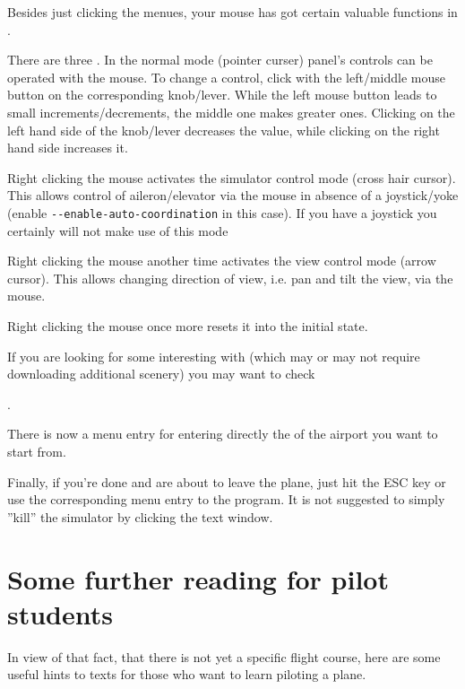 Besides just clicking the menues, your mouse has got certain valuable functions in \FlightGear{}$\!$.


There are three . In the normal mode (pointer curser) panel's controls can be operated with the mouse. To change a control, click with the left/middle mouse button on the corresponding knob/lever. While the left mouse button leads to small increments/decrements, the middle one makes greater ones. Clicking on the left hand side of the knob/lever decreases the value, while clicking on the right hand side increases
it.

 Right clicking the mouse activates the simulator control mode (cross hair cursor). This allows control of aileron/elevator via the mouse in absence of a joystick/yoke (enable \texttt{-$ $-enable-auto-coordination} in this case). If you have a joystick you certainly will not make use of this mode

 Right clicking the mouse another time activates the view control mode (arrow cursor).
 This allows changing direction of view, i.e. pan and tilt the view, via the mouse.

 Right clicking the mouse once more resets it into the initial state.

If you are looking for some interesting  with \FlightGear{}
(which may or may not require downloading additional scenery) you may want to check
 \medskip

 .
  \medskip

\noindent
 There is now a menu entry for entering directly the  of the
airport you want to start from.

Finally, if you're done and are about to leave the plane, just hit the ESC key or use the
corresponding menu entry to  the program. It is not suggested to simply
''kill'' the simulator by clicking the text window.

\section{Some further reading for pilot students\label{flightschoool}}

In view of that fact, that there is not yet a \FlightGear{} specific flight course, here
are some useful hints to texts for those who want to learn piloting a plane.

